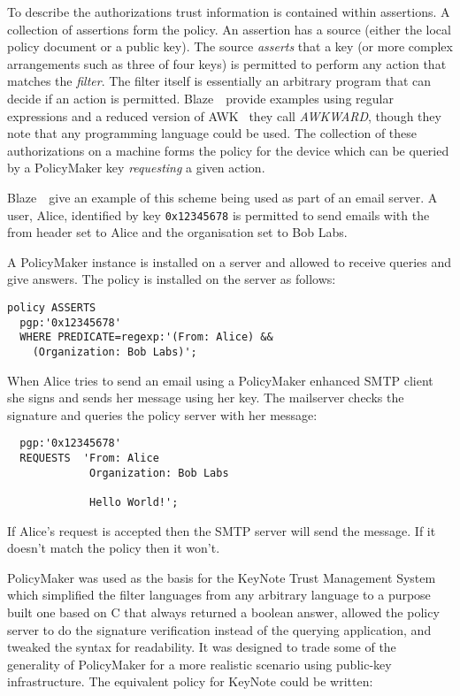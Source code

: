 \documentclass[thesis.tex]{subfiles}
\begin{document}
To describe the authorizations trust information is contained within
assertions.  A collection of assertions form the policy.  An assertion
has a source (either the local policy document or a public key). The
source \emph{asserts} that a key (or more complex arrangements such as
three of four keys) is permitted to perform any action that matches
the \emph{filter}.  The filter itself is essentially an arbitrary
program that can decide if an action is permitted.
Blaze~\etal~provide examples using regular expressions and a reduced
version of AWK~\cite{aho_awk-pattern_1979} they call \emph{AWKWARD},
though they note that any programming language could be used.  The
collection of these authorizations on a machine forms the policy for
the device which can be queried by a PolicyMaker key \emph{requesting}
a given action.

Blaze~\etal~give an example of this scheme being used as part of an
email server.  A user, Alice, identified by key \texttt{0x12345678} is
permitted to send emails with the from header set to Alice and the
organisation set to Bob Labs.

A PolicyMaker instance is installed on a server and allowed to receive queries and give answers.
The policy is installed on the server as follows:

\begin{lstlisting}
policy ASSERTS
  pgp:'0x12345678'
  WHERE PREDICATE=regexp:'(From: Alice) &&
    (Organization: Bob Labs)';
\end{lstlisting}

When Alice tries to send an email using a PolicyMaker enhanced SMTP
client she signs and sends her message using her key.  The mailserver
checks the signature and queries the policy server with her message:

\begin{lstlisting}
  pgp:'0x12345678'
  REQUESTS  'From: Alice
             Organization: Bob Labs

             Hello World!';
\end{lstlisting}

If Alice's request is accepted then the SMTP server will send the
message.  If it doesn't match the policy then it won't.

PolicyMaker was used as the basis for the KeyNote Trust Management
System~\cite{blaze_role_1999,blaze_keynote:_1998} which simplified the
filter languages from any arbitrary language to a purpose built one
based on C that always returned a boolean answer, allowed the policy
server to do the signature verification instead of the querying
application, and tweaked the syntax for readability.  It was designed
to trade some of the generality of PolicyMaker for a more realistic
scenario using public-key infrastructure.  The equivalent policy for KeyNote could be written:
\end{document}
